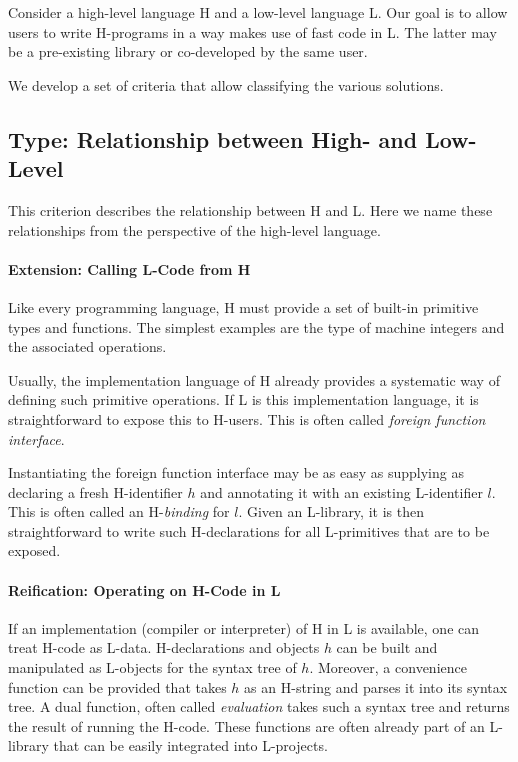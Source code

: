 Consider a high-level language H and a low-level language L.
Our goal is to allow users to write H-programs in a way makes use of fast code in L.
The latter may be a pre-existing library or co-developed by the same user.

We develop a set of criteria that allow classifying the various solutions.

\subsection{Type: Relationship between High- and Low-Level}

This criterion describes the relationship between H and L.
Here we name these relationships from the perspective of the high-level language.

\paragraph{Extension: Calling L-Code from H}
Like every programming language, H must provide a set of built-in primitive types and functions.
The simplest examples are the type of machine integers and the associated operations.

Usually, the implementation language of H already provides a systematic way of defining such primitive operations.
If L is this implementation language, it is straightforward to expose this to H-users.
This is often called \emph{foreign function interface}.

Instantiating the foreign function interface may be as easy as supplying as declaring a fresh H-identifier $h$ and annotating it with an existing L-identifier $l$.
This is often called an H-\emph{binding} for $l$.
Given an L-library, it is then straightforward to write such H-declarations for all L-primitives that are to be exposed.


\paragraph{Reification: Operating on H-Code in L}
If an implementation (compiler or interpreter) of H in L is available, one can treat H-code as L-data.
H-declarations and objects $h$ can be built and manipulated as L-objects for the syntax tree of $h$.
Moreover, a convenience function can be provided that takes $h$ as an H-string and parses it into its syntax tree.
A dual function, often called \emph{evaluation} takes such a syntax tree and returns the result of running the H-code.
These functions are often already part of an L-library that can be easily integrated into L-projects.

